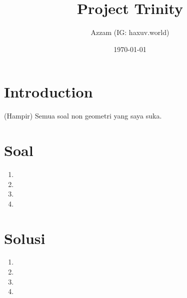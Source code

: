 \documentclass[11pt]{scrartcl}
\title{Project Trinity}
\author{Azzam (IG: haxuv.world)}
\date{\today}
\begin{document}
\maketitle

\section{Introduction}
(Hampir) Semua soal non geometri yang saya suka. 

\section{Soal}
\begin{enumerate}
    \item 
    \item 
    \item 
    \item 
\end{enumerate}

\section{Solusi}
\begin{enumerate}
    \item 
    \item 
    \item 
    \item 
\end{enumerate}
\end{document}
